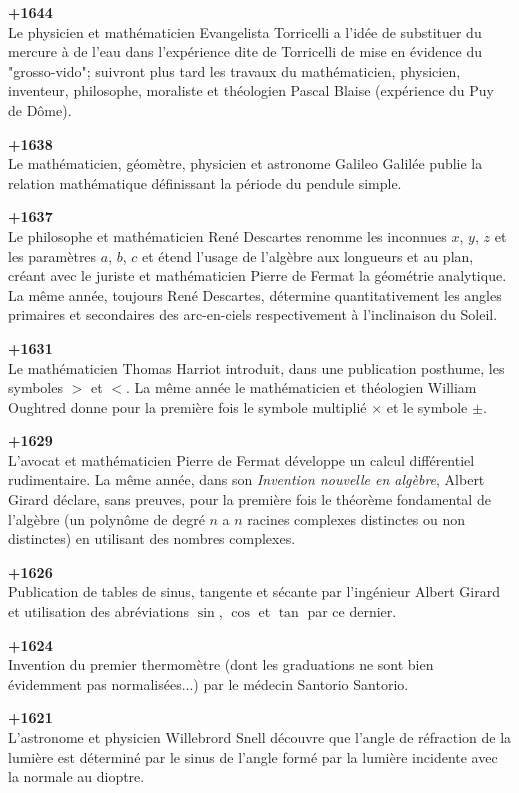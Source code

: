 \textbf{+1644}\\
Le physicien et mathématicien Evangelista Torricelli a l'idée de substituer du mercure à de l'eau dans l'expérience dite de Torricelli de mise en évidence du "grosso-vido"; suivront plus tard les travaux du mathématicien, physicien, inventeur, philosophe, moraliste et théologien Pascal Blaise (expérience du Puy de Dôme).

\textbf{+1638}\\
Le mathématicien, géomètre, physicien et astronome Galileo Galilée publie la relation mathématique définissant la période du pendule simple.

\textbf{+1637}\\
Le philosophe et mathématicien René Descartes renomme les inconnues $x$, $y$, $z$ et les paramètres $a$, $b$, $c$ et étend l'usage de l'algèbre aux longueurs et au plan, créant avec le juriste et mathématicien Pierre de Fermat la géométrie analytique. La même année, toujours René Descartes, détermine quantitativement les angles primaires et secondaires des arc-en-ciels respectivement à l'inclinaison du Soleil.

\textbf{+1631}\\
Le mathématicien Thomas Harriot introduit, dans une publication posthume, les symboles $>$ et $<$. La même année le mathématicien et théologien William Oughtred donne pour la première fois le symbole multiplié $\times$ et le symbole $\pm$.

\textbf{+1629}\\
L'avocat et mathématicien Pierre de Fermat développe un calcul différentiel rudimentaire. La même année, dans son \textit{Invention nouvelle en algèbre}, Albert Girard déclare, sans preuves, pour la première fois le théorème fondamental de l'algèbre (un polynôme de degré $ n $ a $ n $ racines complexes distinctes ou non distinctes) en utilisant des nombres complexes.

\textbf{+1626}\\
Publication de tables de sinus, tangente et sécante par l'ingénieur Albert Girard et utilisation des abréviations $\sin$, $\cos$ et $\tan$ par ce dernier.

\textbf{+1624}\\
Invention du premier thermomètre (dont les graduations ne sont bien évidemment pas normalisées...) par le médecin Santorio Santorio.

\textbf{+1621}\\
L'astronome et physicien Willebrord Snell découvre que l'angle de réfraction de la lumière est déterminé par le sinus de l'angle formé par la lumière incidente avec la normale au dioptre.

